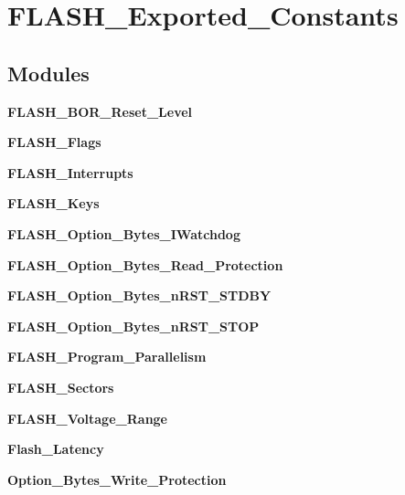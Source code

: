 \section{F\+L\+A\+S\+H\+\_\+\+Exported\+\_\+\+Constants}
\label{group__FLASH__Exported__Constants}
\subsection*{Modules}
\begin{DoxyCompactItemize}
\item 
\textbf{ F\+L\+A\+S\+H\+\_\+\+B\+O\+R\+\_\+\+Reset\+\_\+\+Level}
\item 
\textbf{ F\+L\+A\+S\+H\+\_\+\+Flags}
\item 
\textbf{ F\+L\+A\+S\+H\+\_\+\+Interrupts}
\item 
\textbf{ F\+L\+A\+S\+H\+\_\+\+Keys}
\item 
\textbf{ F\+L\+A\+S\+H\+\_\+\+Option\+\_\+\+Bytes\+\_\+\+I\+Watchdog}
\item 
\textbf{ F\+L\+A\+S\+H\+\_\+\+Option\+\_\+\+Bytes\+\_\+\+Read\+\_\+\+Protection}
\item 
\textbf{ F\+L\+A\+S\+H\+\_\+\+Option\+\_\+\+Bytes\+\_\+n\+R\+S\+T\+\_\+\+S\+T\+D\+BY}
\item 
\textbf{ F\+L\+A\+S\+H\+\_\+\+Option\+\_\+\+Bytes\+\_\+n\+R\+S\+T\+\_\+\+S\+T\+OP}
\item 
\textbf{ F\+L\+A\+S\+H\+\_\+\+Program\+\_\+\+Parallelism}
\item 
\textbf{ F\+L\+A\+S\+H\+\_\+\+Sectors}
\item 
\textbf{ F\+L\+A\+S\+H\+\_\+\+Voltage\+\_\+\+Range}
\item 
\textbf{ Flash\+\_\+\+Latency}
\item 
\textbf{ Option\+\_\+\+Bytes\+\_\+\+Write\+\_\+\+Protection}
\end{DoxyCompactItemize}
